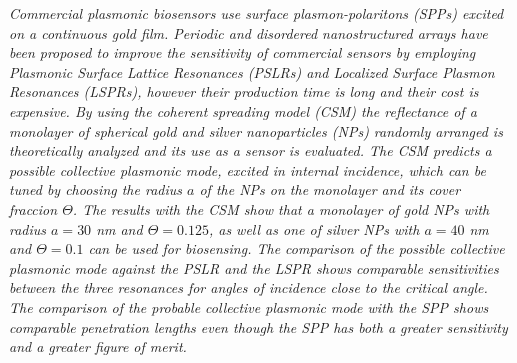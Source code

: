 \begin{abstracts}
\vspace*{1cm}\textit{
Commercial plasmonic biosensors use surface plasmon-polaritons (SPPs) excited on a continuous gold film. Periodic and disordered nanostructured arrays have been proposed to improve the sensitivity of commercial sensors by employing Plasmonic Surface Lattice Resonances (PSLRs) and Localized Surface Plasmon Resonances (LSPRs), however their production time is long and their cost is expensive.  By using the coherent spreading model (CSM) the reflectance of a monolayer of spherical gold and silver nanoparticles (NPs) randomly arranged is theoretically analyzed and its use as a sensor is evaluated. The CSM predicts a possible collective plasmonic mode, excited in internal incidence, which can be tuned by choosing the radius $a$ of the NPs on the monolayer and its cover fraccion $\Theta$. The results with the CSM show that a monolayer of gold NPs with radius $ a = 30 $ nm and $ \Theta = 0.125 $, as well as one of silver NPs with $ a = 40 $ nm and $ \Theta = 0.1 $  can be used for biosensing. The comparison of the possible collective plasmonic mode against the PSLR and the LSPR shows comparable sensitivities between the three resonances for angles of incidence close to the critical angle. The comparison of the probable collective plasmonic mode with the SPP shows comparable penetration lengths even though the SPP has both a greater sensitivity and a greater figure of merit.}



\end{abstracts}


